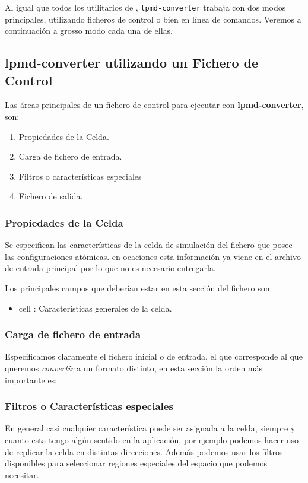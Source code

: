 Al igual que todos los utilitarios de {\lpmd}, \verb|lpmd-converter| trabaja con dos modos principales, utilizando ficheros de control o bien en l\'inea de comandos. Veremos a continuaci\'on a grosso modo cada una de ellas.

\subsection{lpmd-converter utilizando un Fichero de Control}
Las \'areas principales de un fichero de control para ejecutar con \textbf{lpmd-converter}, son:

\begin{enumerate}
 \item Propiedades de la Celda.
 \item Carga de fichero de entrada.
 \item Filtros o caracter\'isticas especiales
 \item Fichero de salida.
\end{enumerate}

\subsubsection{Propiedades de la Celda}
Se especifican las caracter\'isticas de la celda de simulaci\'on del fichero que posee las configuraciones at\'omicas. en ocaciones esta informaci\'on ya viene en el archivo de entrada principal por lo que no es necesario entregarla.

Los principales campos que deber\'ian estar en esta secci\'on del fichero son:
\begin{itemize}
 \item cell : Caracter\'isticas generales de la celda.
\end{itemize}

\subsubsection{Carga de fichero de entrada}
Especificamos claramente el fichero inicial o de entrada, el que corresponde al que queremos \textit{convertir} a un formato distinto, en esta secci\'on la orden m\'as importante es:


\subsubsection{Filtros o Caracter\'isticas especiales}
En general casi cualquier caracter\'istica puede ser asignada a la celda, siempre y cuanto esta tengo alg\'un sentido en la aplicaci\'on, por ejemplo podemos hacer uso de replicar la celda en distintas direcciones. Adem\'as podemos usar los filtros disponibles para seleccionar regiones especiales del espacio que podemos necesitar.

